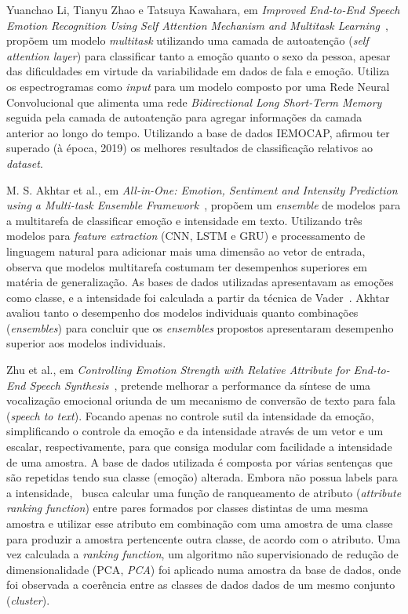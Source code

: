 Yuanchao Li, Tianyu Zhao e Tatsuya Kawahara, em \textit{Improved End-to-End Speech Emotion Recognition Using Self Attention Mechanism and Multitask Learning}~\cite{32.95}, propõem um modelo \textit{multitask} utilizando uma camada de autoatenção (\textit{self attention layer}) para classificar tanto a emoção quanto o sexo da pessoa, apesar das dificuldades em virtude da variabilidade em dados de fala e emoção. Utiliza os espectrogramas como \textit{input} para um modelo composto por uma Rede Neural Convolucional que alimenta uma rede \textit{Bidirectional Long Short-Term Memory} seguida pela camada de autoatenção para agregar informações da camada anterior ao longo do tempo. Utilizando a base de dados IEMOCAP, afirmou ter superado (à época, 2019) os melhores resultados de classificação relativos ao \textit{dataset}.

M. S. Akhtar et al., em \textit{All-in-One: Emotion, Sentiment and Intensity Prediction using a Multi-task Ensemble Framework}~\cite{28}, propõem um \textit{ensemble} de modelos para a multitarefa de classificar emoção e intensidade em texto. Utilizando três modelos para \textit{feature extraction} (\acrshort{CNN}, \acrlong{LSTM} e \acrlong{GRU}) e processamento de linguagem natural para adicionar mais uma dimensão ao vetor de entrada, observa que modelos multitarefa costumam ter desempenhos superiores em matéria de generalização. As bases de dados utilizadas apresentavam as emoções como classe, e a intensidade foi calculada a partir da técnica de Vader~\cite{vader}. Akhtar avaliou tanto o desempenho dos modelos individuais quanto combinações (\textit{ensembles}) para concluir que os \textit{ensembles} propostos apresentaram desempenho superior aos modelos individuais.


Zhu et al., em \textit{Controlling Emotion Strength with Relative Attribute for End-to-End Speech Synthesis}~\cite{63}, pretende melhorar a performance da síntese de uma vocalização emocional oriunda de um mecanismo de conversão de texto para fala (\textit{speech to text}). Focando apenas no controle sutil da intensidade da emoção, simplificando o controle da emoção e da intensidade através de um vetor e um escalar, respectivamente, para que consiga modular com facilidade a intensidade de uma amostra. A base de dados utilizada é composta por várias sentenças que são repetidas tendo sua classe (emoção) alterada. Embora não possua labels para a intensidade,~\cite{63} busca calcular uma função de ranqueamento de atributo (\textit{attribute ranking function}) entre pares formados por classes distintas de uma mesma amostra e utilizar esse atributo em combinação com uma amostra de uma classe para produzir a amostra pertencente outra classe, de acordo com o atributo. Uma vez calculada a \textit{ranking function}, um algoritmo não supervisionado de redução de dimensionalidade (\acrlong{PCA}, \textit{PCA}) foi aplicado numa amostra da base de dados, onde foi observada a coerência entre as classes de dados dados de um mesmo conjunto (\textit{cluster}).

